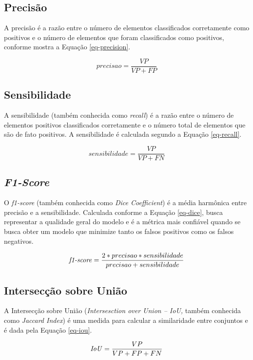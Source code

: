 \subsection{Precisão}
A precisão é a razão entre o número de elementos classificados corretamente como positivos e o número de elementos que foram classificados como positivos, conforme mostra a Equação \ref{eq-precision}.

\begin{equation}
precisao = \frac{VP}{VP + FP}
\label{eq-precision}
\end{equation}

\subsection{Sensibilidade}
A sensibilidade (também conhecida como \textit{recall}) é a razão entre o número de elementos positivos classificados corretamente e o número total de elementos que são de fato positivos. A sensibilidade é calculada segundo a Equação \ref{eq-recall}.

\begin{equation}
sensibilidade = \frac{VP}{VP + FN}
\label{eq-recall}
\end{equation}

\subsection{\textit{F1-Score}}
O \textit{f1-score} (também conhecida como \textit{Dice Coefficient}) é a média harmônica entre precisão e a sensibilidade. Calculada conforme a Equação \ref{eq-dice}, busca representar a qualidade geral do modelo e é a métrica mais confiável quando se busca obter um modelo que minimize tanto os falsos positivos como os falsos negativos.

\begin{equation}
\mbox{\textit{f1-score}} = \frac{2 * precisao * sensibilidade}{precisao + sensibilidade}
\label{eq-dice}
\end{equation}

\subsection{Intersecção sobre União}
A Intersecção sobre União (\emph{Intersesction over Union -- IoU,} também conhecida como \textit{Jaccard Index}) é uma medida para calcular a similaridade entre conjuntos e é dada pela Equação \ref{eq-iou}.

\begin{equation}
\mbox{\textit{IoU}} = \frac{VP}{VP + FP + FN}
\label{eq-iou}
\end{equation}

